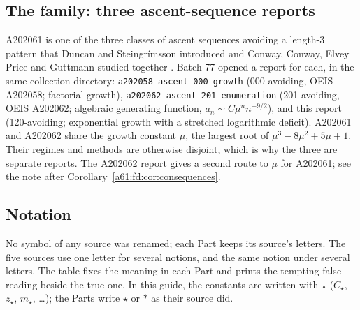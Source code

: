 \documentclass[11pt,letterpaper]{article}
\numberwithin{equation}{section}
\theoremstyle{remark}\newtheorem{remark}[theorem]{Remark}
\newcommand{\repopath}[1]{\nolinkurl{#1}}
\begin{document}
\subsection*{The family: three ascent-sequence reports}
\label{a61:guide:family}
A202061 is one of the three classes of ascent sequences avoiding a length-3 pattern that Duncan and Steingr\'imsson introduced and Conway, Conway, Elvey Price and Guttmann studied together \cite{Conway}. Batch 77 opened a report for each, in the same collection directory: \repopath{a202058-ascent-000-growth} (000-avoiding, OEIS A202058; factorial growth), \repopath{a202062-ascent-201-enumeration} (201-avoiding, OEIS A202062; algebraic generating function, $a_n\sim C\mu^nn^{-9/2}$), and this report (120-avoiding; exponential growth with a stretched logarithmic deficit). A202061 and A202062 share the growth constant $\mu$, the largest root of $\mu^3-8\mu^2+5\mu+1$. Their regimes and methods are otherwise disjoint, which is why the three are separate reports. The A202062 report gives a second route to $\mu$ for A202061; see the note after Corollary~\ref{a61:fd:cor:consequences}.

\subsection*{Notation}
\label{a61:guide:notation}
No symbol of any source was renamed; each Part keeps its source's letters. The five sources use one letter for several notions, and the same notion under several letters. The table fixes the meaning in each Part and prints the tempting false reading beside the true one. In this guide, the constants are written with $\star$ ($C_\star$, $z_\star$, $m_\star$, \dots); the Parts write $\star$ or $*$ as their source did.
\end{document}
